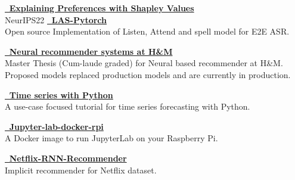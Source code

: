 



\textcolor{SlateGrey}{\textbf{\href{https://arxiv.org/pdf/2205.13662.pdf}{\faChain \, Explaining Preferences with Shapley Values}}} \\ 
NeurIPS22 \newline
\vspace{1pt}
\textcolor{SlateGrey}{\textbf{\href{https://github.com/jiwidi/las-pytorch}{\faGithub \, LAS-Pytorch }}} \\ 
Open source Implementation of Listen, Attend and spell model for E2E ASR.
\newline
\vspace{1pt}

\textcolor{SlateGrey}{\textbf{\href{https://github.com/jiwidi/MASTER_THESIS/blob/master/thesis.pdf}{\faGithub \,  Neural recommender systems at H\&M  }}} \\ 
Master Thesis (Cum-laude graded) for Neural based recommender at H\&M. Proposed models replaced production models and are currently in production.
\newline
\vspace{1pt}

\textcolor{SlateGrey}{\textbf{\href{https://github.com/jiwidi/time-series-forecasting-with-python}{\faGithub \,  Time series with Python  }}} \\ 
A use-case focused tutorial for time series forecasting with Python.
\newline
\vspace{1pt}


\textcolor{SlateGrey}{\textbf{\href{https://github.com/jiwidi/jupyter-lab-docker-rpi}{\faGithub \, Jupyter-lab-docker-rpi}}} \\ 
A Docker image to run JupyterLab on your Raspberry Pi. 
\newline
\vspace{1pt}



\textcolor{SlateGrey}{\textbf{\href{https://github.com/jiwidi/Netflix-RNN-Recommender}{\faGithub \, Netflix-RNN-Recommender}}} \\ 
Implicit recommender for Netflix dataset.
\newline
\vspace{1pt}


